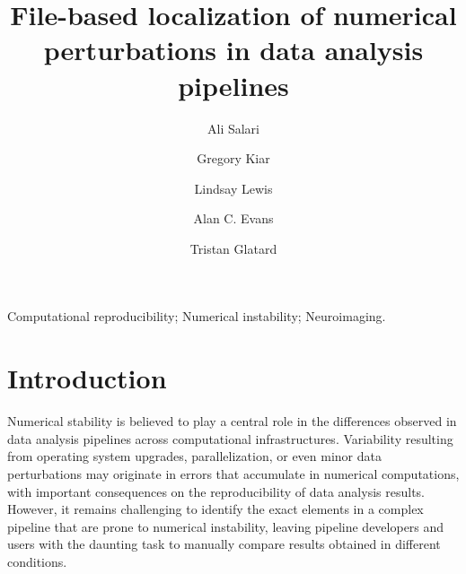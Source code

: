 \documentclass[a4paper,num-refs]{oup-contemporary}
\title{File-based localization of numerical perturbations in data analysis pipelines}
\begin{document}
\author[1]{Ali Salari}
\author[2,3]{Gregory Kiar}
\author[2]{Lindsay Lewis}
\author[2,3]{Alan C. Evans}
\author[1]{Tristan Glatard}




\maketitle

\begin{abstract} 


\end{abstract}

\begin{keywords}
Computational reproducibility; Numerical instability; Neuroimaging.
\end{keywords}


\section{Introduction}


Numerical stability is believed to play a central role in the differences
observed in data analysis pipelines across computational infrastructures.
Variability resulting from operating system upgrades, parallelization, or
even minor data perturbations may originate in errors that accumulate in
numerical computations, with important consequences on the reproducibility
of data analysis results. However, it remains challenging to identify the
exact elements in a complex pipeline that are prone to numerical instability,
leaving pipeline developers and users with the daunting task to manually
compare results obtained in different conditions. 
\end{document}
